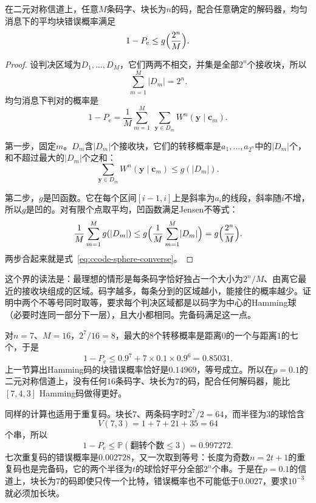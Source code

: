 \begin{theorem}[有限块长的逆向界]
\label{thm:ccode-sphere-converse}
在二元对称信道上，任意$M$条码字、块长为$n$的码，配合任意确定的解码器，均匀消息下的平均块错误概率满足
\begin{equation}
 1-P_{\mathrm{e}}\leq g\Bigl(\frac{2^{n}}{M}\Bigr) .
 \label{eq:ccode-sphere-converse}
\end{equation}
\end{theorem}

\begin{proof}
设判决区域为$D_1,\dots,D_M$，它们两两不相交，并集是全部$2^{n}$个接收块，所以
\[
 \sum_{m=1}^{M}\lvert D_m\rvert=2^{n} .
\]
均匀消息下判对的概率是
\[
 1-P_{\mathrm{e}}=\frac1M\sum_{m=1}^{M}\ \sum_{\bm{y}\in D_m}W^{n}(\bm{y}\mid\bm{c}_m) .
\]

第一步，固定$m$。$D_m$含$\lvert D_m\rvert$个接收块，它们的转移概率是$a_1,\dots,a_{2^{n}}$中的$\lvert D_m\rvert$个，和不超过最大的$\lvert D_m\rvert$个之和：
\[
 \sum_{\bm{y}\in D_m}W^{n}(\bm{y}\mid\bm{c}_m)\leq g(\lvert D_m\rvert) .
\]

第二步，$g$是凹函数。它在每个区间$[i-1,i]$上是斜率为$a_i$的线段，斜率随$i$不增，所以$g$是凹的。对有限个点取平均，凹函数满足Jensen不等式：
\[
 \frac1M\sum_{m=1}^{M}g(\lvert D_m\rvert)\leq g\Bigl(\frac1M\sum_{m=1}^{M}\lvert D_m\rvert\Bigr)=g\Bigl(\frac{2^{n}}{M}\Bigr) .
\]
两步合起来就是式~\eqref{eq:ccode-sphere-converse}。
\end{proof}

这个界的读法是：最理想的情形是每条码字恰好独占一个大小为$2^{n}/M$、由离它最近的接收块组成的区域。码字越多，每条分到的区域越小，能接住的概率越少。证明中两个不等号同时取等，要求每个判决区域都是以码字为中心的Hamming球（必要时连同一部分下一层），且大小都相同。完备码满足这一点。

对$n=7$、$M=16$，$2^{7}/16=8$，最大的$8$个转移概率是距离$0$的一个与距离$1$的七个，于是
\[
 1-P_{\mathrm{e}}\leq0.9^7+7\times0.1\times0.9^6=0.85031 .
\]
上一节算出Hamming码的块错误概率恰好是$0.14969$，等号成立。所以在$p=0.1$的二元对称信道上，没有任何$16$条码字、块长为$7$的码，配合任何解码器，能比$[7,4,3]$ Hamming码做得更好。

同样的计算也适用于重复码。块长$7$、两条码字时$2^{7}/2=64$，而半径为$3$的球恰含
\[
 V(7,3)=1+7+21+35=64
\]
个串，所以
\[
 1-P_{\mathrm{e}}\leq\mathbb{P}(\text{翻转个数}\leq3)=0.997272 .
\]
七次重复码的错误概率是$0.002728$，又一次取到等号：长度为奇数$n=2t+1$的重复码也是完备码，它的两个半径为$t$的球恰好平分全部$2^{n}$个串。于是在$p=0.1$的信道上，块长为$7$的码即使只传一个比特，错误概率也不可能低于$0.0027$，要求$10^{-3}$就必须加长块。

